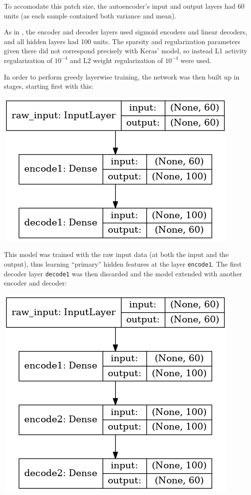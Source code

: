 \documentclass[journal]{IEEEtran}
\begin{document}
To accomodate this patch size, the autoencoder's input and output
layers had 60 units (as each sample contained both variance and mean).

As in \cite{Lasko2013}, the encoder and decoder layers used sigmoid
encoders and linear decoders, and all hidden layers had 100 units.
The sparsity and regularization parameters given there did not
correspond precisely with Keras' model, so instead L1 activity
regularization of $10^{-4}$ and L2 weight regularization of $10^{-4}$
were used.

In order to perform greedy layerwise training\cite{Ng}, the network
was then built up in stages, starting first with this:

\includegraphics[width=0.7\linewidth]{keras_autoencoder1.png}

This model was trained with the raw input data (at both the input and
the output), thus learning ``primary'' hidden features at the layer
\texttt{encode1}.  The first decoder layer \texttt{decode1} was then
discarded and the model extended with another encoder and decoder:

\includegraphics[width=0.7\linewidth]{keras_autoencoder2.png}
\end{document}
